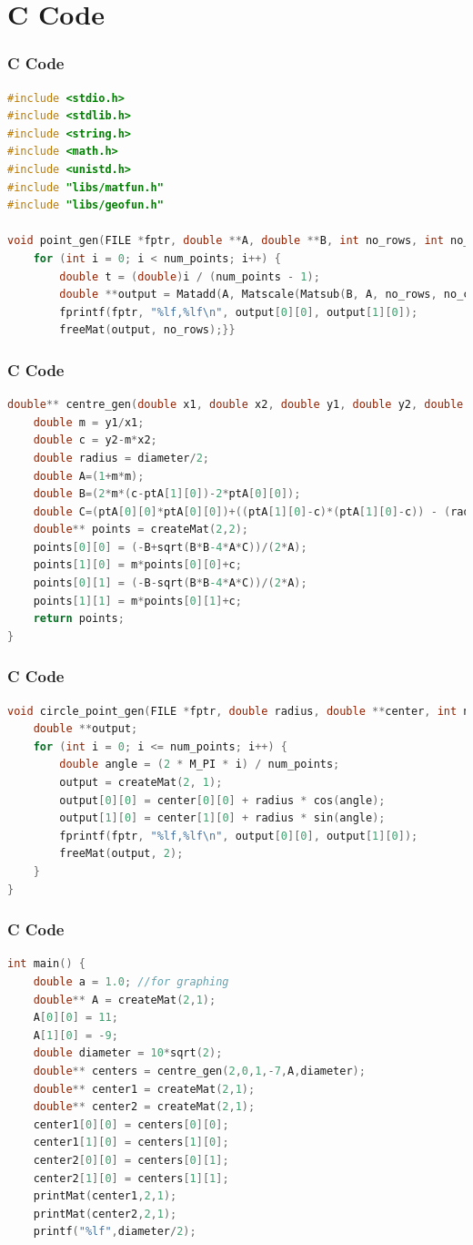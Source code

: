 \documentclass{beamer}
\begin{document}
\section{C Code}
\begin{frame}[fragile]
\frametitle{C Code}
\begin{lstlisting}[language=C]
#include <stdio.h>
#include <stdlib.h>
#include <string.h>
#include <math.h>
#include <unistd.h>
#include "libs/matfun.h"
#include "libs/geofun.h"

void point_gen(FILE *fptr, double **A, double **B, int no_rows, int no_cols, int num_points) {
    for (int i = 0; i < num_points; i++) {
        double t = (double)i / (num_points - 1);
        double **output = Matadd(A, Matscale(Matsub(B, A, no_rows, no_cols), no_rows, no_cols, t), no_rows, no_cols);
        fprintf(fptr, "%lf,%lf\n", output[0][0], output[1][0]);
        freeMat(output, no_rows);}}
\end{lstlisting}
\end{frame}
\begin{frame}[fragile]
\frametitle{C Code}
\begin{lstlisting}[language=C]
double** centre_gen(double x1, double x2, double y1, double y2, double **ptA, double diameter){
    double m = y1/x1;
    double c = y2-m*x2; 
    double radius = diameter/2;
    double A=(1+m*m);
    double B=(2*m*(c-ptA[1][0])-2*ptA[0][0]);
    double C=(ptA[0][0]*ptA[0][0])+((ptA[1][0]-c)*(ptA[1][0]-c)) - (radius*radius);
    double** points = createMat(2,2);
    points[0][0] = (-B+sqrt(B*B-4*A*C))/(2*A);
    points[1][0] = m*points[0][0]+c;
    points[0][1] = (-B-sqrt(B*B-4*A*C))/(2*A);
    points[1][1] = m*points[0][1]+c;
    return points;
}
\end{lstlisting}
\end{frame}
\begin{frame}[fragile]
\frametitle{C Code}
\begin{lstlisting}[language=C]
void circle_point_gen(FILE *fptr, double radius, double **center, int num_points) {
    double **output;
    for (int i = 0; i <= num_points; i++) {
        double angle = (2 * M_PI * i) / num_points;
        output = createMat(2, 1);
        output[0][0] = center[0][0] + radius * cos(angle);
        output[1][0] = center[1][0] + radius * sin(angle);
        fprintf(fptr, "%lf,%lf\n", output[0][0], output[1][0]);
        freeMat(output, 2);
    }
}
\end{lstlisting}
\end{frame}
\begin{frame}[fragile]
\frametitle{C Code}
\begin{lstlisting}[language=C]
int main() {
    double a = 1.0; //for graphing
    double** A = createMat(2,1);
    A[0][0] = 11;
    A[1][0] = -9;
    double diameter = 10*sqrt(2); 
    double** centers = centre_gen(2,0,1,-7,A,diameter);
    double** center1 = createMat(2,1);
    double** center2 = createMat(2,1);
    center1[0][0] = centers[0][0];
    center1[1][0] = centers[1][0];
    center2[0][0] = centers[0][1];
    center2[1][0] = centers[1][1];
    printMat(center1,2,1);
    printMat(center2,2,1);
    printf("%lf",diameter/2);
\end{lstlisting}
\end{frame}
\end{document}
